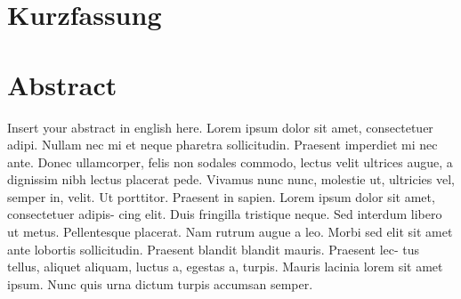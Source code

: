 \section*{Kurzfassung}


\section*{Abstract}
Insert your abstract in english here. Lorem ipsum dolor sit amet, consectetuer adipi.
Nullam nec mi et neque pharetra sollicitudin. Praesent imperdiet mi nec ante. Donec 
ullamcorper, felis non sodales commodo, lectus velit ultrices augue, a dignissim nibh 
lectus placerat pede. Vivamus nunc nunc, molestie ut, ultricies vel, semper in, velit. 
Ut porttitor. Praesent in sapien. Lorem ipsum dolor sit amet, consectetuer adipis- 
cing elit. Duis fringilla tristique neque. Sed interdum libero ut metus. Pellentesque 
placerat. Nam rutrum augue a leo. Morbi sed elit sit amet ante lobortis sollicitudin. 
Praesent blandit blandit mauris. Praesent lec- tus tellus, aliquet aliquam, luctus a, 
egestas a, turpis. Mauris lacinia lorem sit amet ipsum. Nunc quis urna dictum turpis 
accumsan semper.